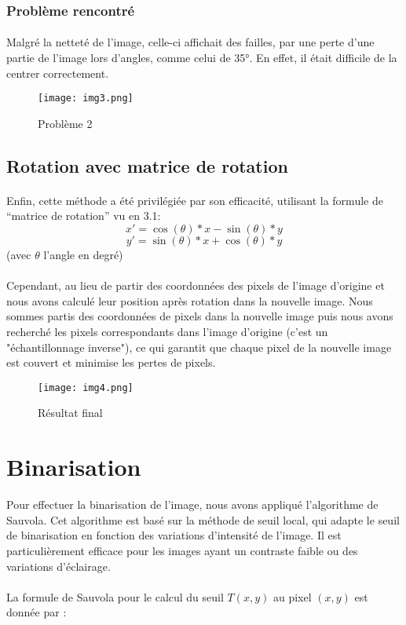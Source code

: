 \documentclass{article}
\begin{document}
\subsubsection{Problème rencontré}
\paragraph{}
Malgré la netteté de l’image, celle-ci affichait des failles, par une perte d’une partie de l’image lors d'angles, comme celui de 35°. En effet, il était difficile de la centrer correctement.
\begin{figure}[H]
    \centering
    \texttt{[image: img3.png]}
    \caption{Problème 2}
\end{figure}
\subsection{Rotation avec matrice de rotation}
\paragraph{}
Enfin, cette méthode a été privilégiée par son efficacité, utilisant la formule de “matrice de rotation” vu en 3.1:
$$
x' = \cos(\theta) * x - \sin(\theta) * y
$$
$$
y' = \sin(\theta) * x + \cos(\theta) * y
$$
(avec $\theta$ l’angle en degré)
\paragraph{}
Cependant, au lieu de partir des coordonnées des pixels de l'image d'origine et nous avons calculé leur position après rotation dans la nouvelle image. Nous sommes partis des coordonnées de pixels dans la nouvelle image puis nous avons recherché les pixels correspondants dans l'image d'origine (c’est un "échantillonnage inverse"), ce qui garantit que chaque pixel de la nouvelle image est couvert et minimise les pertes de pixels.
\begin{figure}[H]
    \centering
    \texttt{[image: img4.png]}
    \caption{Résultat final}
\end{figure}
\section{Binarisation}

Pour effectuer la binarisation de l'image, nous avons appliqué l'algorithme de Sauvola. Cet algorithme est basé sur la méthode de seuil local, qui adapte le seuil de binarisation en fonction des variations d'intensité de l'image. Il est particulièrement efficace pour les images ayant un contraste faible ou des variations d'éclairage.
\\\\
La formule de Sauvola pour le calcul du seuil \(T(x, y)\) au pixel \((x, y)\) est donnée par :
\end{document}
